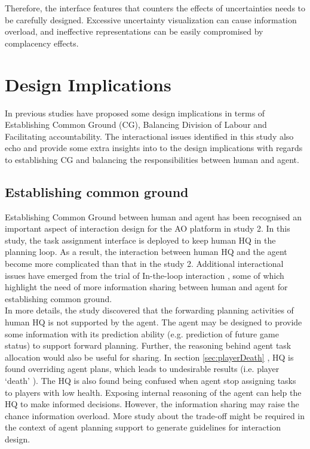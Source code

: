 Therefore, the interface features that counters the effects of uncertainties needs to be carefully designed. Excessive uncertainty visualization can cause information overload, and ineffective representations can be easily compromised by complacency effects. \\





\section{Design Implications}
In previous studies have proposed some design implications in terms of Establishing Common Ground (CG), Balancing Division of Labour and Facilitating accountability. The interactional issues identified in this study also echo and provide some extra insights into to the design implications with regards to establishing CG and balancing the responsibilities between human and agent.\\

\subsection{Establishing common ground}

Establishing Common Ground between human and agent has been recognised an important aspect of interaction design for the AO platform in study 2. In this study, the task assignment interface is deployed to keep human HQ in the planning loop. As a result, the interaction between human HQ and the agent become more complicated than that in the study 2. Additional interactional issues have emerged from the trial of In-the-loop interaction , some of which highlight the need of more information sharing between human and agent for establishing common ground. \\

In more details, the study discovered that the forwarding planning activities of human HQ is not supported by the agent. The agent may be designed to provide some information with its prediction ability (e.g. prediction of future game status) to support forward planning. Further, the reasoning behind agent task allocation would also be useful for sharing. In section \ref{sec:playerDeath} , HQ is found overriding agent plans, which leads to undesirable results (i.e. player `death' ). The HQ is also found being confused when agent stop assigning tasks to players with low health. Exposing internal reasoning of the agent can help the HQ to make informed decisions. However, the information sharing may raise the chance information overload. More study about the trade-off might be required in the context of agent planning support to generate guidelines for interaction design. \\

